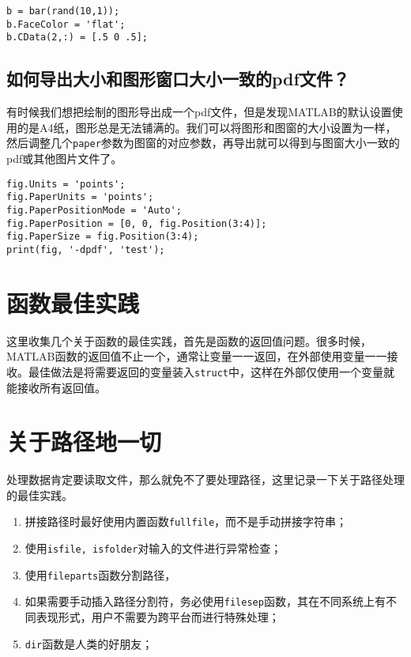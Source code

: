 \begin{verbatim}
b = bar(rand(10,1));
b.FaceColor = 'flat';
b.CData(2,:) = [.5 0 .5];
\end{verbatim}

\subsection{如何导出大小和图形窗口大小一致的pdf文件？}

有时候我们想把绘制的图形导出成一个pdf文件，但是发现MATLAB的默认设置使用的是A4纸，图形总是无法铺满的。我们可以将图形和图窗的大小设置为一样，然后调整几个\texttt{paper}参数为图窗的对应参数，再导出就可以得到与图窗大小一致的pdf或其他图片文件了。

\begin{verbatim}
fig.Units = 'points';
fig.PaperUnits = 'points';
fig.PaperPositionMode = 'Auto';
fig.PaperPosition = [0, 0, fig.Position(3:4)];
fig.PaperSize = fig.Position(3:4);
print(fig, '-dpdf', 'test');
\end{verbatim}

\section{函数最佳实践}

这里收集几个关于函数的最佳实践，首先是函数的返回值问题。很多时候，MATLAB函数的返回值不止一个，通常让变量一一返回，在外部使用变量一一接收。最佳做法是将需要返回的变量装入\texttt{struct}中，这样在外部仅使用一个变量就能接收所有返回值。

\section{关于路径地一切}

处理数据肯定要读取文件，那么就免不了要处理路径，这里记录一下关于路径处理的最佳实践。

\begin{enumerate}
    \item 拼接路径时最好使用内置函数\texttt{fullfile}，而不是手动拼接字符串；
    \item 使用\texttt{isfile, isfolder}对输入的文件进行异常检查；
    \item 使用\texttt{fileparts}函数分割路径，
    \item 如果需要手动插入路径分割符，务必使用\texttt{filesep}函数，其在不同系统上有不同表现形式，用户不需要为跨平台而进行特殊处理；
    \item \texttt{dir}函数是人类的好朋友；
\end{enumerate}

